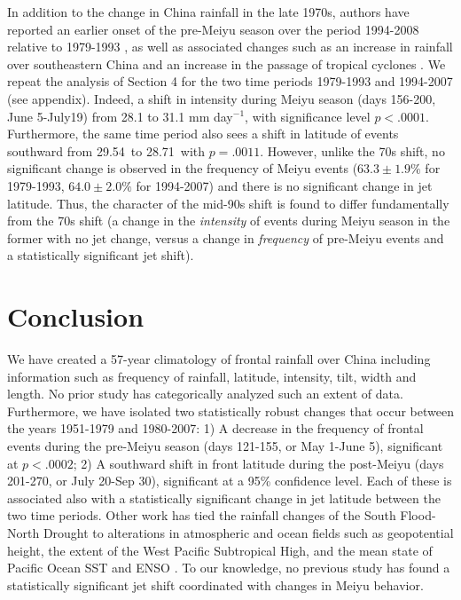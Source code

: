 \documentclass[draft,grl]{AGUTeX}
\begin{document}
\begin{article}
	In addition to the change in China rainfall in the late 1970s, authors have reported an earlier onset of the pre-Meiyu season over the period 1994-2008 relative to 1979-1993 \citep{Kajikawa2012}, as well as associated changes such as an increase in rainfall over southeastern China and an increase in the passage of tropical cyclones \citep{Kwon2007,Chang2014}. We repeat the analysis of Section 4 for the two time periods 1979-1993 and 1994-2007 (see appendix). Indeed, a shift in intensity during Meiyu season (days 156-200, June 5-July19) from 28.1 to 31.1 mm day$^{-1}$, with significance level $p<.0001$. Furthermore, the same time period also sees a shift in latitude of events southward from 29.54\textdegree\ to 28.71\textdegree\ with $p=.0011$. However, unlike the 70s shift, no significant change is observed in the frequency of Meiyu events ($63.3\pm 1.9\%$ for 1979-1993, $64.0\pm 2.0\%$ for 1994-2007) and there is no significant change in jet latitude. Thus, the character of the mid-90s shift is found to differ fundamentally from the 70s shift (a change in the \textit{intensity} of events during Meiyu season in the former with no jet change, versus a change in \textit{frequency} of pre-Meiyu events and a statistically significant jet shift).

\section{Conclusion}

We have created a 57-year climatology of frontal rainfall over China including information such as frequency of rainfall, latitude, intensity, tilt, width and length. No prior study has categorically analyzed such an extent of data. Furthermore, we have isolated two statistically robust changes that occur between the years 1951-1979 and 1980-2007: 1) A decrease in the frequency of frontal events during the pre-Meiyu season (days 121-155, or May 1-June 5), significant at $p < .0002$; 2) A southward shift in front latitude during the post-Meiyu (days 201-270, or July 20-Sep 30), significant at a 95\% confidence level. Each of these is associated also with a statistically significant change in jet latitude between the two time periods. Other work has tied the rainfall changes of the South Flood-North Drought to alterations in atmospheric and ocean fields such as geopotential height, the extent of the West Pacific Subtropical High, and the mean state of Pacific Ocean SST and ENSO \citep{Chang2000}. To our knowledge, no previous study has found a statistically significant jet shift coordinated with changes in Meiyu behavior.


\end{article}
\end{document}
